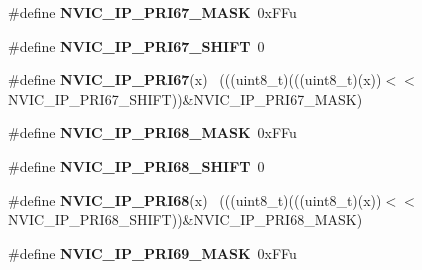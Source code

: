 \begin{DoxyCompactItemize}
\item 
\hypertarget{group___n_v_i_c___register___masks_ga8a5bd5989bf6f6d7175bf3ef8fa6e635}{}\#define {\bfseries N\+V\+I\+C\+\_\+\+I\+P\+\_\+\+P\+R\+I67\+\_\+\+M\+A\+S\+K}~0x\+F\+Fu\label{group___n_v_i_c___register___masks_ga8a5bd5989bf6f6d7175bf3ef8fa6e635}

\item 
\hypertarget{group___n_v_i_c___register___masks_gadfb5c1386558ff7fdf0195233cd609f8}{}\#define {\bfseries N\+V\+I\+C\+\_\+\+I\+P\+\_\+\+P\+R\+I67\+\_\+\+S\+H\+I\+F\+T}~0\label{group___n_v_i_c___register___masks_gadfb5c1386558ff7fdf0195233cd609f8}

\item 
\hypertarget{group___n_v_i_c___register___masks_ga66c12522561c1771c5844d52b37d3cfc}{}\#define {\bfseries N\+V\+I\+C\+\_\+\+I\+P\+\_\+\+P\+R\+I67}(x)                                              ~(((uint8\+\_\+t)(((uint8\+\_\+t)(x))$<$$<$N\+V\+I\+C\+\_\+\+I\+P\+\_\+\+P\+R\+I67\+\_\+\+S\+H\+I\+F\+T))\&N\+V\+I\+C\+\_\+\+I\+P\+\_\+\+P\+R\+I67\+\_\+\+M\+A\+S\+K)\label{group___n_v_i_c___register___masks_ga66c12522561c1771c5844d52b37d3cfc}

\item 
\hypertarget{group___n_v_i_c___register___masks_ga10f732a1a432fc9aac5aa4af5713ddea}{}\#define {\bfseries N\+V\+I\+C\+\_\+\+I\+P\+\_\+\+P\+R\+I68\+\_\+\+M\+A\+S\+K}~0x\+F\+Fu\label{group___n_v_i_c___register___masks_ga10f732a1a432fc9aac5aa4af5713ddea}

\item 
\hypertarget{group___n_v_i_c___register___masks_gaef4ddbde61a5b980b6b058d098bfd5f7}{}\#define {\bfseries N\+V\+I\+C\+\_\+\+I\+P\+\_\+\+P\+R\+I68\+\_\+\+S\+H\+I\+F\+T}~0\label{group___n_v_i_c___register___masks_gaef4ddbde61a5b980b6b058d098bfd5f7}

\item 
\hypertarget{group___n_v_i_c___register___masks_ga08910a1085d45ca72afda13b03400a9d}{}\#define {\bfseries N\+V\+I\+C\+\_\+\+I\+P\+\_\+\+P\+R\+I68}(x)                                              ~(((uint8\+\_\+t)(((uint8\+\_\+t)(x))$<$$<$N\+V\+I\+C\+\_\+\+I\+P\+\_\+\+P\+R\+I68\+\_\+\+S\+H\+I\+F\+T))\&N\+V\+I\+C\+\_\+\+I\+P\+\_\+\+P\+R\+I68\+\_\+\+M\+A\+S\+K)\label{group___n_v_i_c___register___masks_ga08910a1085d45ca72afda13b03400a9d}

\item 
\hypertarget{group___n_v_i_c___register___masks_ga3c8bff456d90bf193ee4170e23c75e92}{}\#define {\bfseries N\+V\+I\+C\+\_\+\+I\+P\+\_\+\+P\+R\+I69\+\_\+\+M\+A\+S\+K}~0x\+F\+Fu\label{group___n_v_i_c___register___masks_ga3c8bff456d90bf193ee4170e23c75e92}


\end{DoxyCompactItemize}

